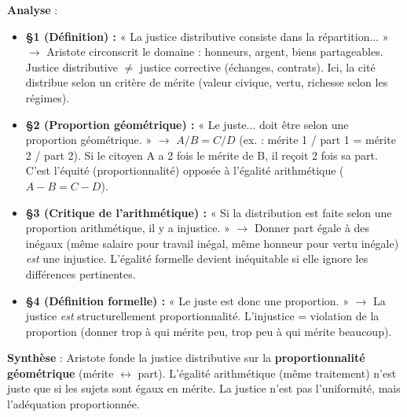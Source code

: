 \documentclass[11pt]{article}
\newcommand{\cle}[1]{{\popxbold\color{popdark}#1}}
\begin{document}
\begin{exoresolu}
\textbf{Analyse} :
\begin{itemize}
    \item \textbf{§1 (Définition) :} « La justice distributive consiste dans la répartition... » $\to$ Aristote circonscrit le domaine : honneurs, argent, biens partageables. \cle{Justice distributive} $\neq$ justice corrective (échanges, contrats). Ici, la cité distribue selon un critère de \cle{mérite} (valeur civique, vertu, richesse selon les régimes).
    \item \textbf{§2 (Proportion géométrique) :} « Le juste... doit être selon une proportion géométrique. » $\to$ $A/B = C/D$ (ex. : mérite 1 / part 1 = mérite 2 / part 2). Si le citoyen A a 2 fois le mérite de B, il reçoit 2 fois sa part. C'est l'\cle{équité} (proportionnalité) opposée à l'égalité arithmétique ($A-B = C-D$).
    \item \textbf{§3 (Critique de l'arithmétique) :} « Si la distribution est faite selon une proportion arithmétique, il y a injustice. » $\to$ Donner part égale à des inégaux (même salaire pour travail inégal, même honneur pour vertu inégale) \emph{est} une injustice. L'égalité formelle devient inéquitable si elle ignore les différences pertinentes.
    \item \textbf{§4 (Définition formelle) :} « Le juste est donc une proportion. » $\to$ La justice \emph{est} structurellement proportionnalité. L'injustice = violation de la proportion (donner trop à qui mérite peu, trop peu à qui mérite beaucoup).
\end{itemize}

\textbf{Synthèse} : Aristote fonde la justice distributive sur la \textbf{proportionnalité géométrique} (mérite $\leftrightarrow$ part). L'égalité arithmétique (même traitement) n'est juste que si les sujets sont égaux en mérite. La justice n'est pas l'uniformité, mais l'adéquation proportionnée.


\end{exoresolu}
\end{document}
